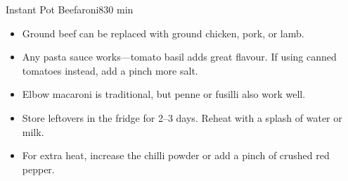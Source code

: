 \begin{recipebox}{Instant Pot Beefaroni}{8}{30 min}
  \begin{notes}
    \begin{itemize}
      \item Ground beef can be replaced with ground chicken, pork, or lamb.
      \item Any pasta sauce works—tomato basil adds great flavour. If using canned tomatoes instead, add a pinch more salt.
      \item Elbow macaroni is traditional, but penne or fusilli also work well.
      \item Store leftovers in the fridge for 2–3 days. Reheat with a splash of water or milk.
      \item For extra heat, increase the chilli powder or add a pinch of crushed red pepper.
    \end{itemize}
  \end{notes}
\end{recipebox}